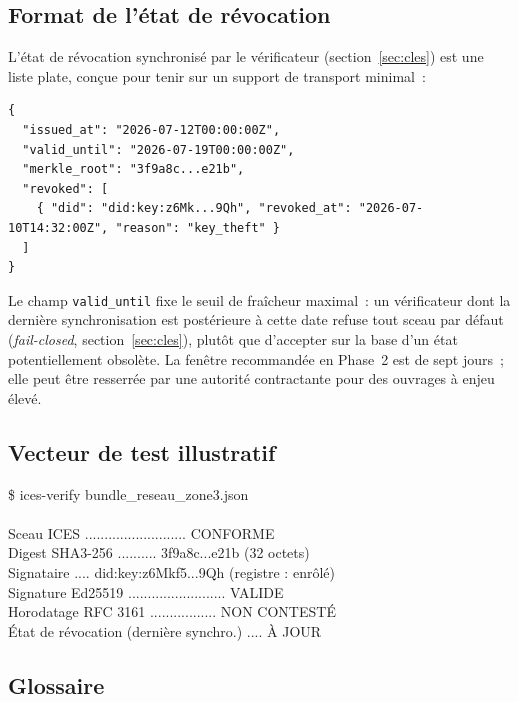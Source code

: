 \documentclass[11pt,a4paper]{article}
\begin{document}
\subsection{Format de l'état de révocation}\label{sec:spec-revocation}

L'état de révocation synchronisé par le vérificateur (section~\ref{sec:cles}) est une liste plate, conçue pour tenir sur un support de transport minimal~:

\begin{lstlisting}[style=icesjson]
{
  "issued_at": "2026-07-12T00:00:00Z",
  "valid_until": "2026-07-19T00:00:00Z",
  "merkle_root": "3f9a8c...e21b",
  "revoked": [
    { "did": "did:key:z6Mk...9Qh", "revoked_at": "2026-07-10T14:32:00Z", "reason": "key_theft" }
  ]
}
\end{lstlisting}

Le champ \texttt{valid\_until} fixe le seuil de fraîcheur maximal~: un vérificateur dont la dernière synchronisation est postérieure à cette date refuse tout sceau par défaut (\emph{fail-closed}, section~\ref{sec:cles}), plutôt que d'accepter sur la base d'un état potentiellement obsolète. La fenêtre recommandée en Phase~2 est de sept jours~; elle peut être resserrée par une autorité contractante pour des ouvrages à enjeu élevé.

\subsection{Vecteur de test illustratif}

\begin{center}
\begin{termbox}
\$ ices-verify bundle\_reseau\_zone3.json\\
\ \\
Sceau ICES .......................... CONFORME\\
Digest SHA3-256 .......... 3f9a8c...e21b (32 octets)\\
Signataire .... did:key:z6Mkf5...9Qh (registre : enrôlé)\\
Signature Ed25519 ......................... VALIDE\\
Horodatage RFC 3161 ................. NON CONTESTÉ\\
État de révocation (dernière synchro.) .... À JOUR
\end{termbox}
\end{center}

\subsection{Glossaire}
\end{document}

